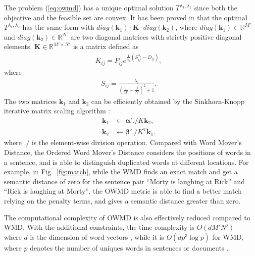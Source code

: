 The problem (\ref{eq:owmd}) has a unique optimal solution $T^{\lambda_1, \lambda_2}$ since both the objective and the feasible set are convex. It has been proved in \cite{su2017order} that the optimal $T^{\lambda_1, \lambda_2}$ has the same form with $diag(\mathbf{k}_1) \cdot \mathbf{K} \cdot diag(\mathbf{k}_2)$, where $diag(\mathbf{k}_1) \in \mathbb{R}^{M'}$ and $diag(\mathbf{k}_2) \in \mathbb{R}^{N'}$ are two diagonal matrices with strictly positive diagonal elements. $\mathbf{K} \in \mathbb{R}^{M'\times N'}$ is a matrix defined as
\begin{equation}
\label{eq:K}
\begin{split}
	K_{ij} = P_{ij} e^{\frac{1}{\lambda_2}(S_{ij}^{\lambda_1} - D_{ij})},
\end{split}
\end{equation}
where
\begin{equation}
\label{eq:S}
\begin{split}
	S_{ij} = \frac{\lambda_1}{(\frac{i}{M'} - \frac{j}{N'})^2 + 1}.
\end{split}
\end{equation}
The two matrices $\mathbf{k}_1$ and $\mathbf{k}_2$ can be efficiently obtained by the Sinkhorn-Knopp iterative matrix scaling algorithm \cite{knight2008sinkhorn}:
\begin{equation}
\label{eq:k1}
\begin{split}
	\mathbf{k}_1 &\leftarrow \mathbf{\alpha'} ./ K \mathbf{k}_2, \\
	\mathbf{k}_2 &\leftarrow \mathbf{\beta'} ./ K^T \mathbf{k}_1.
\end{split}
\end{equation}
where $./$ is the element-wise division operation.
Compared with Word Mover's Distance, the Ordered Word Mover's Distance 
considers the positions of words in a sentence,
and is able to distinguish duplicated words at different locations. For example, in Fig.~\ref{fig:match}, while the WMD finds an exact match and get a semantic distance of zero for the sentence pair ``Morty is laughing at Rick'' and ``Rick is laughing at Morty'', the OWMD metric is able to find a better match relying on the penalty terms, and gives a semantic distance greater than zero.

The computational complexity of OWMD is also effectively reduced compared to WMD. With the additional constraints, the time complexity is $O(dM'N')$ where $d$ is the dimension of word vectors \cite{su2017order}, while it is $O(dp^3\log p)$ for WMD, where $p$ denotes the number of uniques words in sentences or documents \cite{kusner2015word}.


